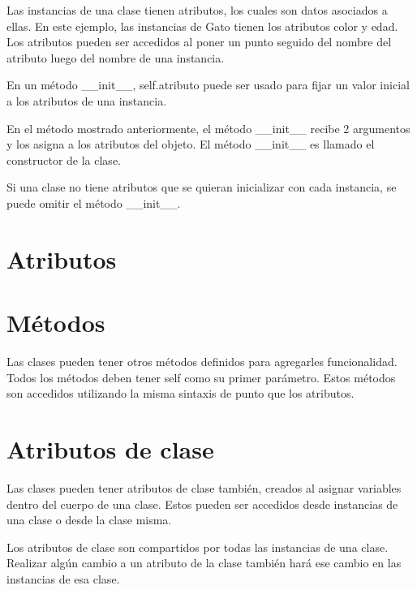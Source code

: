 \documentclass{report}
\begin{document}
{Las instancias de una clase tienen atributos, los cuales son datos asociados a ellas. En este ejemplo, las instancias de Gato tienen los atributos color y edad. Los atributos pueden ser accedidos al poner un punto seguido del nombre del atributo luego del nombre de una instancia.


En un método \_\_init\_\_, self.atributo puede ser usado para fijar un valor inicial a los atributos de una instancia.

En el método mostrado anteriormente, el método \_\_init\_\_ recibe 2 argumentos y los asigna a los atributos del objeto. El método \_\_init\_\_ es llamado el constructor de la clase.

Si una clase no tiene atributos que se quieran inicializar con cada instancia, se puede omitir el método \_\_init\_\_.



\section{Atributos}

\section{Métodos}

Las clases pueden tener otros métodos definidos para agregarles funcionalidad. Todos los métodos deben tener self como su primer parámetro.
Estos métodos son accedidos utilizando la misma sintaxis de punto que los atributos.


\section{Atributos de clase}

Las clases pueden tener atributos de clase también, creados al asignar variables dentro del cuerpo de una clase. Estos pueden ser accedidos desde instancias de una clase o desde la clase misma.


Los atributos de clase son compartidos por todas las instancias de una clase. Realizar algún cambio a un atributo de la clase también hará ese cambio en las instancias de esa clase.

}
\end{document}
